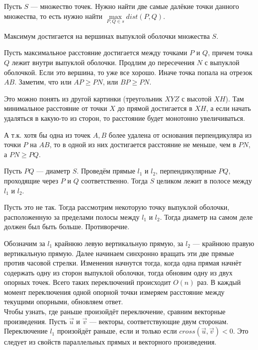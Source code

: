 \Task Пусть $S$ — множество точек. Нужно найти две самые далёкие точки данного множества, то есть нужно найти $\max \limits_{P, Q \in s} dist(P, Q)$.

\Statement Максимум достигается на вершинах выпуклой оболочки множества $S$. 

\Proof
Пусть максимальное расстояние достигается между точками $P$ и $Q$, причем точка $Q$ лежит внутри выпуклой оболочки. Продлим до пересечения $N$ с выпуклой оболочкой. Если это вершина, то уже все хорошо. Иначе точка попала на отрезок $AB$. Заметим, что или $AP \geq PN$, или $BP \geq PN$. 

Это можно понять из другой картинки (треугольник $XYZ$ с высотой $XH$). Там минимальное расстояние от точки $X$ до прямой достигается в $XH$, а если начать удаляться в какую-то из сторон, то расстояние будет монотонно увеличиваться. 

А т.к. хотя бы одна из точек $A, B$ более удалена от основания перпендикуляра из точки $P$ на $AB$, то в одной из них достигается расстояние не меньше, чем в $PN$, а $PN \geq PQ$.

\EndProof

\Lemma Пусть $PQ$ — диаметр $S$. Проведём прямые $l_1$ и $l_2$, перпендикулярные $PQ$, проходящие через $P$ и $Q$ соответственно. Тогда $S$ целиком лежит в полосе между $l_1$ и $l_2$.

\Proof
Пусть это не так. Тогда рассмотрим некоторую точку выпуклой оболочки, расположенную за пределами полосы между $l_1$ и $l_2$. Тогда диаметр на самом деле должен был быть больше. Противоречие. 

\EndProof

Обозначим за $l_1$ крайнюю левую вертикальную прямую, за $l_2$ — крайнюю правую вертикальную прямую. Далее начинаем синхронно вращать эти две прямые против часовой стрелки. Изменения начнутся тогда, когда одна прямая начнёт содержать одну из сторон выпуклой оболочки, тогда обновим одну из двух опорных точек. Всего таких переключений происходит $O(n)$ раз. В каждый момент переключения одной опорной точки измеряем расстояние между текущими опорными, обновляем ответ.\\

Чтобы узнать, где раньше произойдёт переключение, сравним векторные произведения. Пусть $\vec{u}$ и $\vec{v}$ — векторы, соответствующие двум сторонам. Переключение $l_1$ произойдёт раньше, если и только если $cross(\vec{u}, \vec{v}) < 0$. Это следует из свойств параллельных прямых и векторного произведения.

